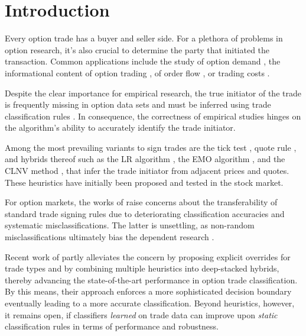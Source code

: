 \section{Introduction}\label{sec:introduction}

Every option trade has a buyer and seller side. For a plethora of problems in option research, it’s also crucial to determine the party that initiated the transaction. Common applications include the study of option demand \autocite[][3]{garleanuDemandBasedOptionPricing2009}, the informational content of option trading \autocites[][631]{huDoesOptionTrading2014}[][882]{panInformationOptionVolume2006}, of order flow \autocite[][684]{muravyevOrderFlowExpected2016}, or trading costs \autocite[][4980]{muravyevOptionsTradingCosts2020}. 


Despite the clear importance for empirical research, the true initiator of the trade is frequently missing in option data sets and must be inferred using trade classification rules \autocite[][453]{easleyOptionVolumeStock1998}. In consequence, the correctness of empirical studies hinges on the algorithm's ability to accurately identify the trade initiator.

Among the most prevailing variants to sign trades are the tick test \autocite[][240]{hasbrouckTradesQuotesInventories1988}, quote rule \autocite[][41]{harrisDayEndTransactionPrice1989}, and hybrids thereof such as the \gls{LR} algorithm \autocite[][745]{leeInferringTradeDirection1991}, the \gls{EMO} algorithm \autocite[][536]{ellisAccuracyTradeClassification2000}, and the \gls{CLNV} method \autocite[][3809]{chakrabartyTradeClassificationAlgorithms2007}, that infer the trade initiator from adjacent prices and quotes. These heuristics have initially been proposed and tested in the stock market.

For option markets, the works of \textcites[][10--13]{grauerOptionTradeClassification2022}[][887]{savickasInferringDirectionOption2003} raise concerns about the transferability of standard trade signing rules due to deteriorating classification accuracies and systematic misclassifications. The latter is unsettling, as non-random misclassifications ultimately bias the dependent research \autocite[][260]{odders-whiteOccurrenceConsequencesInaccurate2000}.

Recent work of \textcite[][13--16]{grauerOptionTradeClassification2022} partly alleviates the concern by proposing explicit overrides for trade types and by combining multiple heuristics into deep-stacked hybrids, thereby advancing the state-of-the-art performance in option trade classification. By this means, their approach enforces a more sophisticated decision boundary eventually leading to a more accurate classification. Beyond heuristics, however, it remains open, if classifiers \emph{learned} on trade data can improve upon \emph{static} classification rules in terms of performance and robustness.


